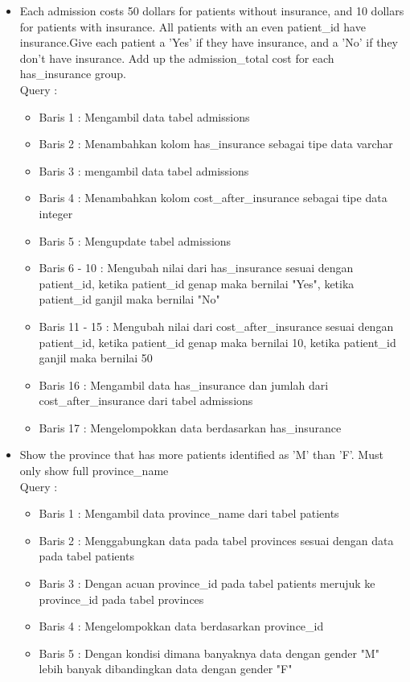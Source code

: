 \documentclass[]{article}
\begin{document}
\begin{itemize}
        \item Each admission costs 50 dollars for patients without insurance, and 10 dollars for patients with insurance. All patients with an even patient\_id have insurance.Give each patient a 'Yes' if they have insurance, and a 'No' if they don't have insurance. Add up the admission\_total cost for each has\_insurance group.
        \\Query :
        
        \begin{itemize}
            \item Baris 1 : Mengambil data tabel admissions
            \item Baris 2 : Menambahkan kolom has\_insurance sebagai tipe data varchar
            \item Baris 3 : mengambil data tabel admissions
            \item Baris 4 : Menambahkan kolom cost\_after\_insurance sebagai tipe data integer
            \item Baris 5 : Mengupdate tabel admissions
            \item Baris 6 - 10 : Mengubah nilai dari has\_insurance sesuai dengan patient\_id, ketika patient\_id genap maka bernilai "Yes", ketika patient\_id ganjil maka bernilai "No"
            \item Baris 11 - 15 : Mengubah nilai dari cost\_after\_insurance sesuai dengan patient\_id, ketika patient\_id genap maka bernilai 10, ketika patient\_id ganjil maka bernilai 50
            \item Baris 16 : Mengambil data has\_insurance dan jumlah dari \\cost\_after\_insurance dari tabel admissions
            \item Baris 17 : Mengelompokkan data berdasarkan has\_insurance
        \end{itemize}

        \item Show the province that has more patients identified as 'M' than 'F'. Must only show full province\_name
        \\Query :
        
        \begin{itemize}
            \item Baris 1 : Mengambil data province\_name dari tabel patients
            \item Baris 2 : Menggabungkan data pada tabel provinces sesuai dengan data pada tabel patients
            \item Baris 3 : Dengan acuan province\_id pada tabel patients merujuk ke province\_id pada tabel provinces
            \item Baris 4 : Mengelompokkan data berdasarkan province\_id
            \item Baris 5 : Dengan kondisi dimana banyaknya data dengan gender "M" lebih banyak dibandingkan data dengan gender "F"
        \end{itemize}


\end{itemize}
\end{document}
